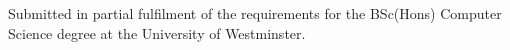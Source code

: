 \begin{titlepage}
\begin{center}


\large{Submitted in partial fulfilment of the requirements for the
BSc(Hons) Computer Science degree at the University of Westminster.} \\[0.5cm]


\end{center}

\end{titlepage}